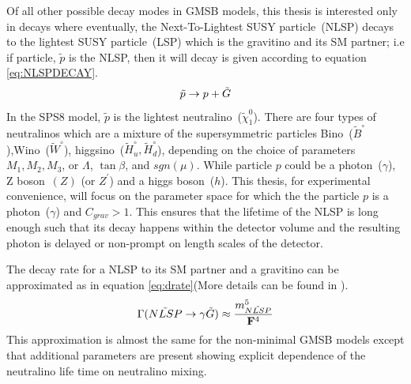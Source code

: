 {Of all other possible decay modes in GMSB models, this thesis is interested only in decays where eventually, the Next-To-Lightest SUSY particle~(NLSP) decays to the lightest SUSY particle~(LSP) which is the gravitino and its SM partner; i.e if particle, $\tilde{p}$ is the NLSP, then it will decay is given according to equation \ref{eq:NLSPDECAY}.
\begin{equation}{\label{eq:NLSPDECAY}}
\tilde{p}\rightarrow p + \tilde{G}
\end{equation}
In the SPS8 model, $\tilde{p}$ is the lightest neutralino~($\tilde{\chi}^{0}_{1}$). There are four types of neutralinos which are a mixture of the supersymmetric particles Bino~($\tilde{B}^{\circ}$),Wino~($\tilde{W}^{\circ}$), higgsino~($\tilde{H}^{\circ}_{u},\tilde{H}^{\circ}_{d}$), depending on the choice of parameters $M_{1},M_{2},M_{3}$, or $\Lambda$, $\tan\beta$, and $sgn(\mu)$.
While particle $p$ could be a photon~($\gamma$), Z boson~$(Z)$ (or $Z^{\prime}$) and a higgs boson~($h$).
This thesis, for experimental convenience, will focus on the parameter space for which the the particle $p$ is a photon~($\gamma$) and $C_{grav} > 1$.
This ensures that the lifetime of the NLSP is long enough such that its decay happens within the detector volume and the resulting photon is delayed or non-prompt on length scales of the detector.

The decay rate for a NLSP to its SM partner and a gravitino can be approximated as in equation \ref{eq:drate}(More details can be found in \cite{SM, GMSB, NLSP}).
\begin{equation}{\label{eq:drate}}
\Gamma(\tilde{NLSP} \rightarrow \gamma\tilde{G}) \approx  \frac{m^{5}_{\tilde{NLSP}}}{\mathbf{F}^{4}}
\end{equation}
This approximation is almost the same for the non-minimal GMSB models except that additional  parameters are present showing explicit dependence of the neutralino life time on neutralino mixing.




}
